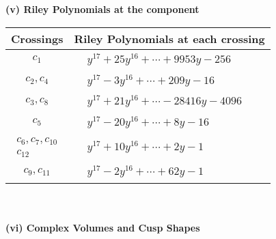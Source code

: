 \documentclass[1p]{elsarticle_modified}
\theoremstyle{definition}
\begin{document}
\newpage\renewcommand{\arraystretch}{1}
\flushleft \textbf{(v) Riley Polynomials at the component}\newline \\
\begin{tabular}{m{50pt}|m{274pt}}
Crossings & \hspace{64pt}Riley Polynomials at each crossing \\
\hline $$\begin{aligned}c_{1}\end{aligned}$$&$\begin{aligned}
&y^{17}+25 y^{16}+\cdots+9953 y-256
\end{aligned}$\\
\hline $$\begin{aligned}c_{2},c_{4}\end{aligned}$$&$\begin{aligned}
&y^{17}-3 y^{16}+\cdots+209 y-16
\end{aligned}$\\
\hline $$\begin{aligned}c_{3},c_{8}\end{aligned}$$&$\begin{aligned}
&y^{17}+21 y^{16}+\cdots-28416 y-4096
\end{aligned}$\\
\hline $$\begin{aligned}c_{5}\end{aligned}$$&$\begin{aligned}
&y^{17}-20 y^{16}+\cdots+8 y-16
\end{aligned}$\\
\hline $$\begin{aligned}c_{6},c_{7},c_{10}\\c_{12}\end{aligned}$$&$\begin{aligned}
&y^{17}+10 y^{16}+\cdots+2 y-1
\end{aligned}$\\
\hline $$\begin{aligned}c_{9},c_{11}\end{aligned}$$&$\begin{aligned}
&y^{17}-2 y^{16}+\cdots+62 y-1
\end{aligned}$\\
\hline
\end{tabular}\\~\\
\newpage\flushleft \textbf{(vi) Complex Volumes and Cusp Shapes}
\end{document}
